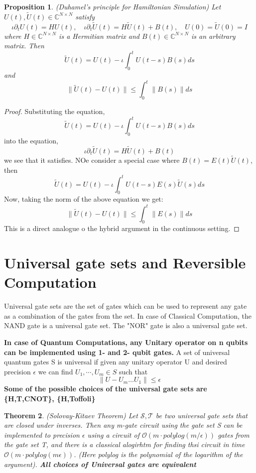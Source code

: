 \documentclass[12pt, oneside]{book}
\newtheorem{theorem}{Theorem}[section]
\newtheorem{proposition}[theorem]{Proposition}
\theoremstyle{definition}
\theoremstyle{definition}
\theoremstyle{remark}
\begin{document}
\begin{proposition}
    \textit{(Duhamel's principle for Hamiltonian Simulation)} Let $U(t),\tilde{U}(t) \in \mathbb{C}^{N \times N}$
    satisfy
    \[ \iota \partial_t U(t)=HU(t), \quad \iota\partial_t \tilde{U}(t) = H\tilde{U}(t) + B(t), \quad U(0)=\tilde{U}(0)=I \]
    where $H \in \mathbb{C}^{N \times N}$ is a Hermitian matrix and $B(t) \in \mathbb{C}^{N \times N}$ is an arbitrary matrix. Then
    \[ \tilde{U}(t)=U(t)-\iota\int_0^t U(t-s)B(s)ds \]
    and
    \[\|\tilde{U}(t)-U(t)\|\leq \int_0^t\|B(s)\|ds\]
\end{proposition}
\begin{proof}
    Substituting the equation,
    \[ \tilde{U}(t)=U(t)-\iota\int_0^t U(t-s)B(s)ds \]
    into the equation,
    \[ \iota\partial_t \tilde{U}(t) = H\tilde{U}(t)+B(t) \]
    we see that it satisfies.
    NOe consider a special case where $B(t)=E(t)\tilde{U}(t)$, then
    \[\tilde{U}(t)=U(t)-\iota \int_0^t U(t-s)E(s)\tilde{U}(s)ds\]
    Now, taking the norm of the above equation we get:
    \[\|\tilde{U}(t)-U(t)\|\leq \int_0^t\|E(s)\|ds\]
    This is a direct analogue o the hybrid argument in the continuous setting.
\end{proof}
 
\section{Universal gate sets and Reversible Computation}
Universal gate sets are the set of gates which can be used to represent any gate as a combination of the gates from the set.
In case of Classical Computation, the NAND gate is a universal gate set. The "NOR" gate is also a universal gate set.
 
\textbf{In case of Quantum Computations, any Unitary operator on n qubits can be implemented using
1- and 2- qubit gates.} A set of universal quantum gates S is universal if given any unitary operator U and desired precision $\epsilon$ we can
find $U_1,\cdots, U_m \in S$ such that
\[\|U-U_m\ldots U_1\| \leq \epsilon\]
\textbf{Some of the possible choices of the universal gate sets are \{H,T,CNOT\}, \{H,Toffoli\}}
 
\begin{theorem}
    \textit{(Solovay-Kitaev Theorem)} Let $\mathcal{S}, \mathcal{T}$ be two universal gate sets
    that are closed under inverses. Then any m-gate circuit using the gate set S can be implemented to precision
    $\epsilon$ using a circuit of $\mathcal{O}(m\cdot polylog(m/\epsilon))$ gates from the gate set T, and there is
    a classical alogirhtm for finding thsi circuit in time $\mathcal{O}(m\cdot polylog(m\epsilon))$. (Here polylog is the
    polynomial of the logarithm of the argument). \textbf{All choices of Universal gates are equivalent}
\end{theorem}
 
\end{document}
